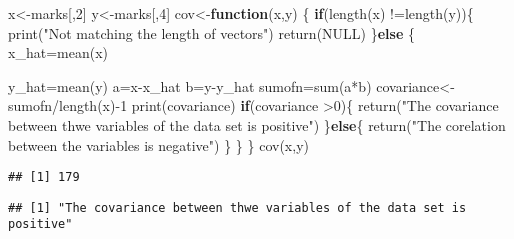 \documentclass[
]{article}
\newenvironment{Shaded}{\begin{snugshade}}{\end{snugshade}}
\newcommand{\ConstantTok}[1]{\textcolor[rgb]{0.00,0.00,0.00}{#1}}
\newcommand{\ControlFlowTok}[1]{\textcolor[rgb]{0.13,0.29,0.53}{\textbf{#1}}}
\newcommand{\DecValTok}[1]{\textcolor[rgb]{0.00,0.00,0.81}{#1}}
\newcommand{\FunctionTok}[1]{\textcolor[rgb]{0.00,0.00,0.00}{#1}}
\newcommand{\NormalTok}[1]{#1}
\newcommand{\OtherTok}[1]{\textcolor[rgb]{0.56,0.35,0.01}{#1}}
\newcommand{\SpecialCharTok}[1]{\textcolor[rgb]{0.00,0.00,0.00}{#1}}
\newcommand{\StringTok}[1]{\textcolor[rgb]{0.31,0.60,0.02}{#1}}
\begin{document}
\begin{Shaded}
\begin{Highlighting}[]
\NormalTok{x}\OtherTok{\textless{}{-}}\NormalTok{marks[,}\DecValTok{2}\NormalTok{]}
\NormalTok{y}\OtherTok{\textless{}{-}}\NormalTok{marks[,}\DecValTok{4}\NormalTok{]}
\NormalTok{cov}\OtherTok{\textless{}{-}}\ControlFlowTok{function}\NormalTok{(x,y) \{}
  \ControlFlowTok{if}\NormalTok{(}\FunctionTok{length}\NormalTok{(x) }\SpecialCharTok{!=}\FunctionTok{length}\NormalTok{(y))\{}
    \FunctionTok{print}\NormalTok{(}\StringTok{"Not matching the length of vectors"}\NormalTok{)}
    \FunctionTok{return}\NormalTok{(}\ConstantTok{NULL}\NormalTok{)}
\NormalTok{  \}}\ControlFlowTok{else}\NormalTok{ \{}
\NormalTok{    x\_hat}\OtherTok{=}\FunctionTok{mean}\NormalTok{(x)}
    
\NormalTok{    y\_hat}\OtherTok{=}\FunctionTok{mean}\NormalTok{(y)}
\NormalTok{    a}\OtherTok{=}\NormalTok{x}\SpecialCharTok{{-}}\NormalTok{x\_hat}
\NormalTok{    b}\OtherTok{=}\NormalTok{y}\SpecialCharTok{{-}}\NormalTok{y\_hat}
\NormalTok{    sumofn}\OtherTok{=}\FunctionTok{sum}\NormalTok{(a}\SpecialCharTok{*}\NormalTok{b)}
\NormalTok{    covariance}\OtherTok{\textless{}{-}}\NormalTok{sumofn}\SpecialCharTok{/}\FunctionTok{length}\NormalTok{(x)}\SpecialCharTok{{-}}\DecValTok{1}
    \FunctionTok{print}\NormalTok{(covariance)}
    \ControlFlowTok{if}\NormalTok{(covariance }\SpecialCharTok{\textgreater{}}\DecValTok{0}\NormalTok{)\{}
      \FunctionTok{return}\NormalTok{(}\StringTok{"The covariance between thwe variables of the data set is positive"}\NormalTok{)}
\NormalTok{    \}}\ControlFlowTok{else}\NormalTok{\{}
      \FunctionTok{return}\NormalTok{(}\StringTok{"The corelation between the variables is negative"}\NormalTok{)}
\NormalTok{    \}}
\NormalTok{  \}}
\NormalTok{\}}
\FunctionTok{cov}\NormalTok{(x,y)}
\end{Highlighting}
\end{Shaded}

\begin{verbatim}
## [1] 179
\end{verbatim}

\begin{verbatim}
## [1] "The covariance between thwe variables of the data set is positive"
\end{verbatim}
\end{document}
